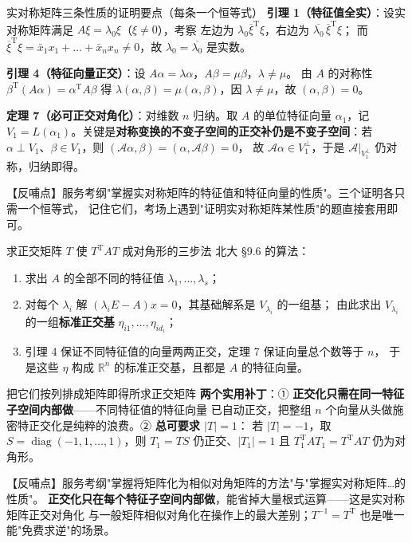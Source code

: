 \begin{fdeep}{实对称矩阵三条性质的证明要点（每条一个恒等式）}
\textbf{引理 1（特征值全实）}：设实对称矩阵满足 $A\xi=\lambda_0\xi$（$\xi\ne0$），考察
左边为 $\lambda_0\overline{\xi}^{\mathrm{T}}\xi$，右边为 $\overline{\lambda_0}\,\overline{\xi}^{\mathrm{T}}\xi$；
而 $\overline{\xi}^{\mathrm{T}}\xi=\bar x_1x_1+\dots+\bar x_nx_n\ne0$，故 $\lambda_0=\overline{\lambda_0}$ 是实数。

\textbf{引理 4（特征向量正交）}：设 $A\alpha=\lambda\alpha$，$A\beta=\mu\beta$，$\lambda\ne\mu$。
由 $A$ 的对称性 $\beta^{\mathrm{T}}(A\alpha)=\alpha^{\mathrm{T}}A\beta$ 得
$\lambda(\alpha,\beta)=\mu(\alpha,\beta)$，因 $\lambda\ne\mu$，故 $(\alpha,\beta)=0$。

\textbf{定理 7（必可正交对角化）}：对维数 $n$ 归纳。取 $A$ 的单位特征向量 $\alpha_1$，记
$V_1=L(\alpha_1)$。关键是\textbf{对称变换的不变子空间的正交补仍是不变子空间}：若
$\alpha\perp V_1$、$\beta\in V_1$，则 $(\mathscr{A}\alpha,\beta)=(\alpha,\mathscr{A}\beta)=0$，
故 $\mathscr{A}\alpha\in V_1^{\perp}$，于是 $\mathscr{A}|_{V_1^{\perp}}$ 仍对称，归纳即得。

【反哺点】服务考纲"掌握实对称矩阵的特征值和特征向量的性质"。三个证明各只需一个恒等式，
记住它们，考场上遇到"证明实对称矩阵某性质"的题直接套用即可。
\end{fdeep}

\begin{fdeep}{求正交矩阵 $T$ 使 $T^{\mathrm{T}}AT$ 成对角形的三步法}
北大 §9.6 的算法：
\begin{enumerate}[leftmargin=2.2em,itemsep=0.2em]
\item 求出 $A$ 的全部不同的特征值 $\lambda_1,\dots,\lambda_s$；
\item 对每个 $\lambda_i$ 解 $(\lambda_iE-A)x=0$，其基础解系是 $V_{\lambda_i}$ 的一组基；
      由此求出 $V_{\lambda_i}$ 的一组\textbf{标准正交基} $\eta_{i1},\dots,\eta_{id_i}$；
\item 引理 4 保证不同特征值的向量两两正交，定理 7 保证向量总个数等于 $n$，
      于是这些 $\eta$ 构成 $\mathbb{R}^n$ 的标准正交基，且都是 $A$ 的特征向量。
\end{enumerate}
把它们按列排成矩阵即得所求正交矩阵
\textbf{两个实用补丁}：① \textbf{正交化只需在同一特征子空间内部做}——不同特征值的特征向量
已自动正交，把整组 $n$ 个向量从头做施密特正交化是纯粹的浪费。② \textbf{总可要求 $|T|=1$}：
若 $|T|=-1$，取 $S=\operatorname{diag}(-1,1,\dots,1)$，则 $T_1=TS$ 仍正交、$|T_1|=1$
且 $T_1^{\mathrm{T}}AT_1=T^{\mathrm{T}}AT$ 仍为对角形。

【反哺点】服务考纲"掌握将矩阵化为相似对角矩阵的方法"与"掌握实对称矩阵…的性质"。
\textbf{正交化只在每个特征子空间内部做}，能省掉大量根式运算——这是实对称矩阵正交对角化
与一般矩阵相似对角化在操作上的最大差别；$T^{-1}=T^{\mathrm{T}}$ 也是唯一能"免费求逆"的场景。
\end{fdeep}


